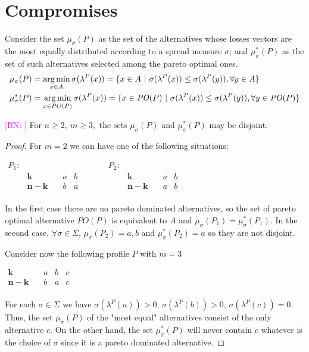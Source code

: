 \documentclass[version=3.21, pagesize, notitlepage, twoside=off, bibliography=totoc, DIV=calc, fontsize=12pt, a4paper]{scrartcl}
\newcommand{\commentBN}[1]{\textcolor{magenta}{\small$\big[$BN: #1$\big]$}}
\newcommand{\paretopt}{\mathit{PO}}
\newcommand{\musigma}{\mu_{\sigma}}
\newcommand{\mustar}{\mu_{\sigma}^*}
\begin{document}
\section{Compromises}
Consider the set $\musigma(P)$ as the set of the alternatives whose losses vectors are the most equally distributed according to a spread measure $\sigma$; and $\mustar(P)$ as the set of such alternatives selected among the pareto optimal ones. 
\begin{align}
	\musigma(P) & = \argmin_{x \in A} \sigma(\lambda^P(x)) = \{ x \in A \ | \ \sigma (\lambda^P(x))\leq \sigma (\lambda^P(y)), \forall y \in A \} \\
	\mustar(P) & = \argmin_{x \in PO(P)} \sigma(\lambda^P(x)) = \{ x \in \paretopt(P) \ | \ \sigma (\lambda^P(x))\leq \sigma (\lambda^P(y)), \forall y \in \paretopt(P) \} 
\end{align}
\begin{proposition} \label{prop:disjoint}
	 \commentBN{}
	{\color{magenta} For $n\geq 2, \ m\geq3,$} the sets $\musigma(P)$ and $\mustar(P)$ may be disjoint.
\end{proposition}
	\begin{proof} For $m=2$ we can have one of the following situations:
	\begin{center}
		$
		\begin{array}{ccccccccc}
		P_1:&&&&&P_2:&&&\\ 
		&\mathbf{k} \quad &a&b&  \qquad &&\mathbf{k} \quad &a&b\\
		&\mathbf{n-k} \quad &b&a& \qquad &&\mathbf{n-k} \quad &a&b\\
		\end{array}
		$
	\end{center}
	In the first case there are no pareto dominated alternatives, so the set of pareto optimal alternative $PO(P)$ is equivalent to $A$ and $\musigma(P_1)=\mustar(P_1)$. In the second case, $\forall \sigma \in \Sigma$, $\musigma(P_2)={a,b}$ and $\mustar(P_2)={a}$ so they are not disjoint.
		
		Consider now the following profile $P$ with $m=3$
		\begin{center}
			$
			\begin{array}{cccc}
			\mathbf{k} \quad &a&b&c\\
			\mathbf{n-k} \quad &b&a&c\\
			\end{array}
			$
		\end{center}
		For each $\sigma \in \Sigma$ we have $\sigma(\lambda^P(a))>0$, $\sigma(\lambda^P(b))>0$, $\sigma(\lambda^P(c))=0$. Thus, the set $\musigma(P)$ of the "most equal" alternatives consist of the only alternative $c$. On the other hand, the set $\mustar(P)$ will never contain $c$ whatever is the choice of $\sigma$ since it is a pareto dominated alternative.
	\end{proof}
\end{document}
